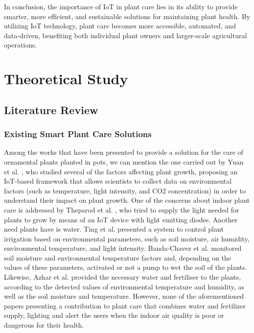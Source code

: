 \documentclass[12pt,a4paper,oneside,english]{book}
\begin{document}
In conclusion, the importance of IoT in plant care lies in its ability to provide smarter, more efficient, and sustainable solutions for maintaining plant health. By utilizing IoT technology, plant care becomes more accessible, automated, and data-driven, benefiting both individual plant owners and larger-scale agricultural operations.

\chapter{Theoretical Study}
\section{Literature Review}
\subsection{Existing Smart Plant Care Solutions}
Among the works that have been presented to provide a solution for the care of ornamental plants planted in pots, we can mention the one carried out by Yuan et al. \citep{yuan2020iot}, who studied several of the factors affecting plant growth, proposing an IoT-based framework that allows scientists to collect data on environmental factors (such as temperature, light intensity, and CO2 concentration) in order to understand their impact on plant growth. One of the concerns about indoor plant care is addressed by Theparod et al. \citep{theparod2019iot}, who tried to supply the light needed for plants to grow by means of an IoT device with light emitting diodes. Another need plants have is water. Ting et al. \citep{ting2020irrigation} presented a system to control plant irrigation based on environmental parameters, such as soil moisture, air humidity, environmental temperature, and light intensity. Banda-Chavez et al. \citep{banda2018intelligent} monitored soil moisture and environmental temperature factors and, depending on the values of these parameters, activated or not a pump to wet the soil of the plants. Likewise, Azhar et al. \citep{azhar2017controlling} provided the necessary water and fertiliser to the plants, according to the detected values of environmental temperature and humidity, as well as the soil moisture and temperature. However, none of the aforementioned papers presenting a contribution to plant care that combines water and fertilizer supply, lighting and alert the users when the indoor air quality is poor or dangerous for their health.
\end{document}
